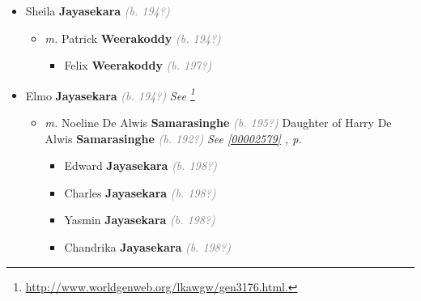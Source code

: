 \documentclass[10pt, openany]{book}
\begin{document}
\begin{itemize}
{\begin{itemize}
{\begin{itemize}
{\begin{itemize}
{\begin{itemize}
\item{\textit{m.} Chrishantie \textbf{Thalagala} \textcolor{gray}{\textit{(b. 194?)}}   \label{couple:00000298:00000855} \begin{itemize}
\item{Renuki \textbf{Jayasekara} \textcolor{gray}{\textit{(b. 197?)}}
 }
\item{Leshan \textbf{Jayasekara} \textcolor{gray}{\textit{(b. 197?)}}
 }
\end{itemize}}
\end{itemize}
 }
\item{Sheila \textbf{Jayasekara} \textcolor{gray}{\textit{(b. 194?)}}
\begin{itemize}
\item{\textit{m.} Patrick \textbf{Weerakoddy} \textcolor{gray}{\textit{(b. 194?)}}   \label{couple:00000318:00000920} \begin{itemize}
\item{Felix \textbf{Weerakoddy} \textcolor{gray}{\textit{(b. 197?)}}
 }
\end{itemize}}
\end{itemize}
 }
\item{Elmo \textbf{Jayasekara} \textcolor{gray}{\textit{(b. 194?)}} \textcolor{slmaroon}{\textit{See \footnote{\url{http://www.worldgenweb.org/lkawgw/gen3176.html.}}}}
\begin{itemize}
\item{\textit{m.} Noeline De Alwis \textbf{Samarasinghe} \textcolor{gray}{\textit{(b. 195?)}} Daughter of  Harry De Alwis \textbf{Samarasinghe} \textcolor{gray}{\textit{(b. 192?)}} \textcolor{slteal}{\textit{See  \autoref{00002579} \textit{, p. \pageref{00002579} }}}   \label{couple:00000290:00002573} \begin{itemize}
\item{Edward \textbf{Jayasekara} \textcolor{gray}{\textit{(b. 198?)}}
 }
\item{Charles \textbf{Jayasekara} \textcolor{gray}{\textit{(b. 198?)}}
 }
\item{Yasmin \textbf{Jayasekara} \textcolor{gray}{\textit{(b. 198?)}}
 }
\item{Chandrika \textbf{Jayasekara} \textcolor{gray}{\textit{(b. 198?)}}
 }

\end{itemize}}
\end{itemize}}
\end{itemize}}
\end{itemize}}
\end{itemize}}
\end{itemize}
\end{document}

